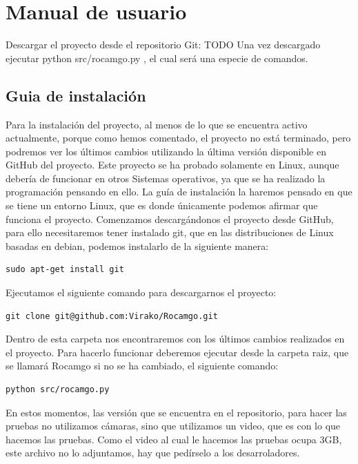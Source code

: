 \documentclass[12pt,a4paper]{report}
\begin{document}
\chapter{Manual de usuario}

Descargar el proyecto desde el repositorio Git: TODO %
Una vez descargado ejecutar python src/rocamgo.py , el cual será una especie de
comandos.

\section{Guia de instalación} 

Para la instalación del proyecto, al menos de lo que se encuentra activo
actualmente, porque como hemos comentado, el proyecto no está terminado, pero
podremos ver los últimos cambios utilizando la última versión disponible en
GitHub del proyecto. Este proyecto se ha probado solamente en Linux, aunque
debería de funcionar en otros Sistemas operativos, ya que se ha realizado la
programación pensando en ello. 
La guía de instalación la haremos pensado en que se tiene un entorno Linux, que
es donde únicamente podemos afirmar que funciona el proyecto. Comenzamos
descargándonos el proyecto desde GitHub, para ello necesitaremos tener instalado
git, que en las distribuciones de Linux basadas en debian, podemos instalarlo de
la siguiente manera: 

\begin{verbatim}
sudo apt-get install git
\end{verbatim}

Ejecutamos el siguiente comando para descargarnos el proyecto: 

\begin{verbatim}
git clone git@github.com:Virako/Rocamgo.git
\end{verbatim}

Dentro de esta carpeta nos encontraremos con los últimos cambios realizados en
el proyecto. Para hacerlo funcionar deberemos ejecutar desde la carpeta raiz,
que se llamará Rocamgo si no se ha cambiado, el siguiente comando:

\begin{verbatim}
python src/rocamgo.py
\end{verbatim}

En estos momentos, las versión que se encuentra en el repositorio, para hacer
las pruebas no utilizamos cámaras, sino que utilizamos un video, que es con lo
que hacemos las pruebas. Como el video al cual le hacemos las pruebas ocupa 3GB,
este archivo no lo adjuntamos, hay que pedírselo a los desarroladores. 
\end{document}
